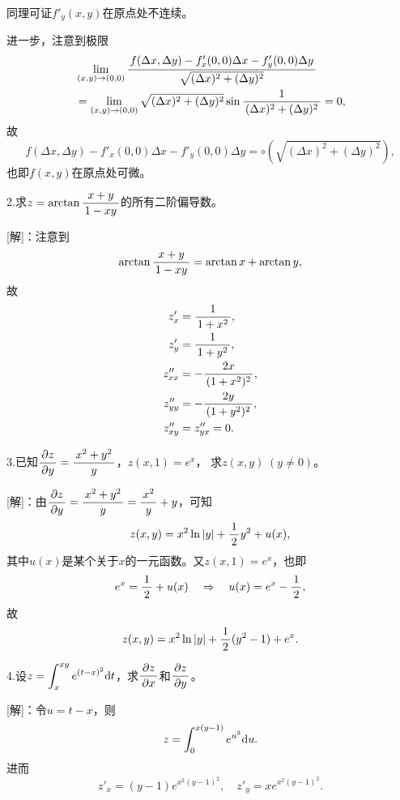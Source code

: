 同理可证$f'_y(x,y)$在原点处不连续。

进一步，注意到极限
\begin{align*}
	&\lim\limits_{(x,y)\to(0,0)}\df{f(\Delta x,\Delta y)-f'_x(0,0)\Delta x
	-f'_y(0,0)\Delta y}{\sqrt{(\Delta x)^2+(\Delta y)^2}}\\
	&=\lim\limits_{(x,y)\to(0,0)}\sqrt{(\Delta x)^2+(\Delta y)^2}
	\sin\df1{(\Delta x)^2+(\Delta y)^2}=0,
\end{align*}
故
$$f(\Delta x,\Delta y)-f'_x(0,0)\Delta x-f'_y(0,0)\Delta y
=\circ(\sqrt{(\Delta x)^2+(\Delta y)^2}),$$
也即$f(x,y)$在原点处可微。\fin

\bs

% 

2.求$z=\arctan\df{x+y}{1-xy}$的所有二阶偏导数。

[解]：注意到
$$\arctan\df{x+y}{1-xy}=\arctan x+\arctan y,$$
故
\begin{align*}
	z'_x&=\df1{1+x^2},\\
	z'_y&=\df1{1+y^2},\\
	z''_{xx}&=-\df{2x}{(1+x^2)^2},\\
	z''_{yy}&=-\df{2y}{(1+y^2)^2},\\
	z''_{xy}&=z''_{yx}=0.
\end{align*}
\fin

\bs

3.已知$\df{\p z}{\p y}=\df{x^2+y^2}y$，$z(x,1)=e^x$，
求$z(x,y)\;(y\ne0)$。

[解]：由$\df{\p z}{\p y}=\df{x^2+y^2}y=\df{x^2}y+y$，可知
$$z(x,y)=x^2\ln|y|+\df12y^2+u(x),$$
其中$u(x)$是某个关于$x$的一元函数。又$z(x,1)=e^x$，也即
$$e^x=\df12+u(x)\quad
\Rightarrow\quad u(x)=e^x-\df12,$$
故
$$z(x,y)=x^2\ln|y|+\df12(y^2-1)+e^x.$$
\fin

\bs

4.设$z=\dint_x^{xy}e^{(t-x)^2}\d t$，求$\df{\p z}{\p x}$和$\df{\p z}{\p y}$。

[解]：令$u=t-x$，则
$$z=\dint_0^{x(y-1)}e^{u^2}\d u.$$
进而
$$
	z'_x=(y-1)e^{x^2(y-1)^2},\quad z'_y=xe^{x^2(y-1)^2}.
$$
\fin

